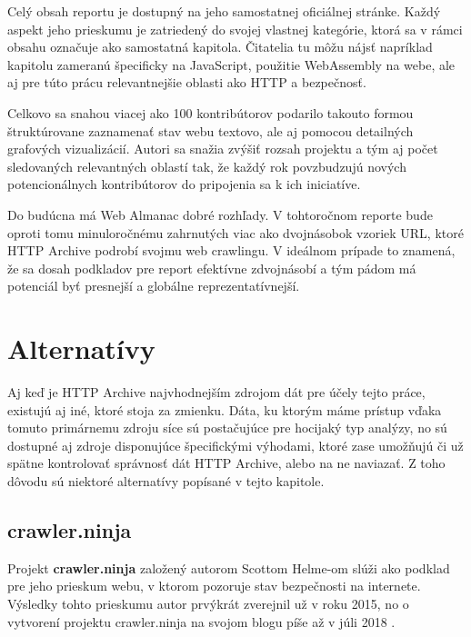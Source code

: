 
Celý obsah reportu je dostupný na jeho samostatnej oficiálnej stránke. 
Každý aspekt jeho prieskumu je zatriedený do svojej vlastnej kategórie, ktorá sa v rámci obsahu označuje ako samostatná kapitola.
Čitatelia tu môžu nájsť napríklad kapitolu zameranú špecificky na JavaScript, použitie WebAssembly na webe, ale aj pre túto prácu relevantnejšie oblasti ako HTTP a bezpečnosť.

Celkovo sa snahou viacej ako 100 kontribútorov podarilo takouto formou štruktúrovane zaznamenať stav webu textovo, ale aj pomocou detailných grafových vizualizácií.
Autori sa snažia zvýšiť rozsah projektu a tým aj počet sledovaných relevantných oblastí tak, že každý rok povzbudzujú nových potencionálnych kontribútorov do pripojenia sa k ich iniciatíve. 

Do budúcna má Web Almanac dobré rozhľady. V tohtoročnom reporte bude oproti tomu minuloročnému zahrnutých viac ako dvojnásobok vzoriek URL, ktoré HTTP Archive podrobí svojmu web crawlingu.
V ideálnom prípade to znamená, že sa dosah podkladov pre report efektívne zdvojnásobí a tým pádom má potenciál byť presnejší a globálne reprezentatívnejší.


\section{Alternatívy}
\label{httparchive-alternatives}

Aj keď je HTTP Archive najvhodnejším zdrojom dát pre účely tejto práce, existujú aj iné, ktoré stoja za zmienku.
Dáta, ku ktorým máme prístup vďaka tomuto primárnemu zdroju síce sú postačujúce pre hocijaký typ analýzy, no sú dostupné aj zdroje disponujúce špecifickými výhodami, ktoré
zase umožňujú či už spätne kontrolovať správnosť dát HTTP Archive, alebo na ne naviazať.
Z toho dôvodu sú niektoré alternatívy popísané v tejto kapitole.

\subsection{crawler.ninja}

Projekt \textbf{crawler.ninja} založený autorom Scottom Helme-om slúži ako podklad pre jeho prieskum
webu, v ktorom pozoruje stav bezpečnosti na internete. 
Výsledky tohto prieskumu autor prvýkrát zverejnil už v roku 2015, no o vytvorení projektu crawler.ninja na svojom blogu píše až v júli 2018 \cite{crawler-ninja}. 

